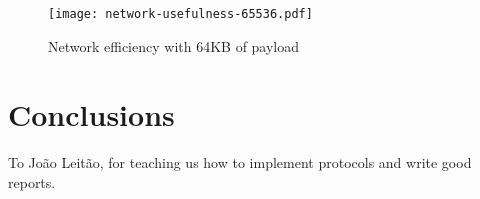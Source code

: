\documentclass[sigconf]{acmart}
\begin{document}
\begin{figure}[htp]
    \centering
    \texttt{[image: network-usefulness-65536.pdf]}
    \caption{Network efficiency with 64KB of payload}
    \label{fig:network-efficiency-65536}
\end{figure}

\section{Conclusions}

\begin{acks}
    To João Leitão, for teaching us how to implement protocols and write good reports.
\end{acks}



\end{document}
